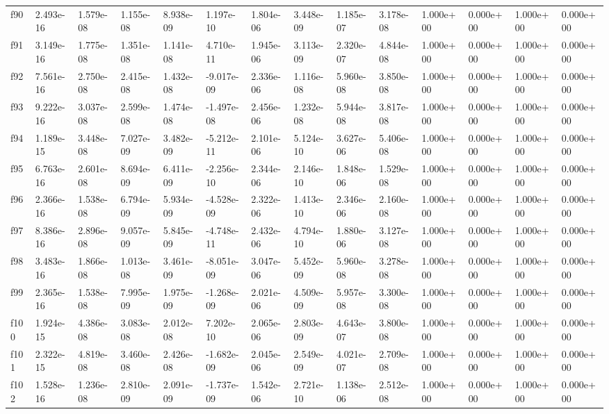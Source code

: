 \begin{table}
\begin{tabular}{llllllllllllll}
f90 & 2.493e-16 & 1.579e-08 & 1.155e-08 & 8.938e-09 & 1.197e-10 & 1.804e-06 & 3.448e-09 & 1.185e-07 & 3.178e-08 & 1.000e+00 & 0.000e+00 & 1.000e+00 & 0.000e+00 \\
f91 & 3.149e-16 & 1.775e-08 & 1.351e-08 & 1.141e-08 & 4.710e-11 & 1.945e-06 & 3.113e-09 & 2.320e-07 & 4.844e-08 & 1.000e+00 & 0.000e+00 & 1.000e+00 & 0.000e+00 \\
f92 & 7.561e-16 & 2.750e-08 & 2.415e-08 & 1.432e-08 & -9.017e-09 & 2.336e-06 & 1.116e-08 & 5.960e-08 & 3.850e-08 & 1.000e+00 & 0.000e+00 & 1.000e+00 & 0.000e+00 \\
f93 & 9.222e-16 & 3.037e-08 & 2.599e-08 & 1.474e-08 & -1.497e-08 & 2.456e-06 & 1.232e-08 & 5.944e-08 & 3.817e-08 & 1.000e+00 & 0.000e+00 & 1.000e+00 & 0.000e+00 \\
f94 & 1.189e-15 & 3.448e-08 & 7.027e-09 & 3.482e-09 & -5.212e-11 & 2.101e-06 & 5.124e-10 & 3.627e-06 & 5.406e-08 & 1.000e+00 & 0.000e+00 & 1.000e+00 & 0.000e+00 \\
f95 & 6.763e-16 & 2.601e-08 & 8.694e-09 & 6.411e-09 & -2.256e-10 & 2.344e-06 & 2.146e-10 & 1.848e-06 & 1.529e-08 & 1.000e+00 & 0.000e+00 & 1.000e+00 & 0.000e+00 \\
f96 & 2.366e-16 & 1.538e-08 & 6.794e-09 & 5.934e-09 & -4.528e-09 & 2.322e-06 & 1.413e-10 & 2.346e-06 & 2.160e-08 & 1.000e+00 & 0.000e+00 & 1.000e+00 & 0.000e+00 \\
f97 & 8.386e-16 & 2.896e-08 & 9.057e-09 & 5.845e-09 & -4.748e-11 & 2.432e-06 & 4.794e-10 & 1.880e-06 & 3.127e-08 & 1.000e+00 & 0.000e+00 & 1.000e+00 & 0.000e+00 \\
f98 & 3.483e-16 & 1.866e-08 & 1.013e-08 & 3.461e-09 & -8.051e-09 & 3.047e-06 & 5.452e-09 & 5.960e-08 & 3.278e-08 & 1.000e+00 & 0.000e+00 & 1.000e+00 & 0.000e+00 \\
f99 & 2.365e-16 & 1.538e-08 & 7.995e-09 & 1.975e-09 & -1.268e-09 & 2.021e-06 & 4.509e-09 & 5.957e-08 & 3.300e-08 & 1.000e+00 & 0.000e+00 & 1.000e+00 & 0.000e+00 \\
f100 & 1.924e-15 & 4.386e-08 & 3.083e-08 & 2.012e-08 & 7.202e-10 & 2.065e-06 & 2.803e-09 & 4.643e-07 & 3.800e-08 & 1.000e+00 & 0.000e+00 & 1.000e+00 & 0.000e+00 \\
f101 & 2.322e-15 & 4.819e-08 & 3.460e-08 & 2.426e-08 & -1.682e-09 & 2.045e-06 & 2.549e-09 & 4.021e-07 & 2.709e-08 & 1.000e+00 & 0.000e+00 & 1.000e+00 & 0.000e+00 \\
f102 & 1.528e-16 & 1.236e-08 & 2.810e-09 & 2.091e-09 & -1.737e-09 & 1.542e-06 & 2.721e-10 & 1.138e-06 & 2.512e-08 & 1.000e+00 & 0.000e+00 & 1.000e+00 & 0.000e+00 \\

\end{tabular}
\end{table}
